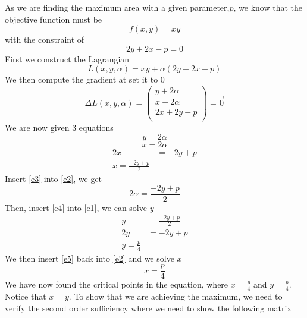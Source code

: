 
As we are finding the maximum area with a given parameter,$p$, we know that the objective function must be
\begin{equation*}
f(x,y) = xy
\end{equation*}
with the constraint of 
\begin{equation*}
2y + 2x - p = 0
\end{equation*}
First we construct the Lagrangian
\begin{equation*}
L(x,y,\alpha) = xy + \alpha(2y + 2x - p)
\end{equation*}
We then compute the gradient at set it to 0
\begin{equation*}
\Delta L(x,y,\alpha) = 
\begin{pmatrix}
y + 2\alpha\\
x + 2\alpha\\
2x + 2y -p \\
\end{pmatrix}
= \vec{0}
\end{equation*}
We are now given 3 equations
\begin{equation}\label{e1}
y = 2\alpha
\end{equation}
\begin{equation}\label{e2}
x = 2\alpha
\end{equation}
\begin{equation}
\begin{aligned}\label{e3}
2x &= -2y + p \\
x = \frac{-2y + p}{2}
\end{aligned}
\end{equation}
Insert \ref{e3} into \ref{e2}, we get
\begin{equation}\label{e4}
2 \alpha = \frac{-2y + p}{2}
\end{equation}
Then, insert \ref{e4} into \ref{e1}, we can solve $y$
\begin{equation}\label{e5}
\begin{aligned}
y &= \frac{-2y + p}{2}\\
2y &= -2y + p\\
y = \frac{p}{4}
\end{aligned}
\end{equation}
We then insert \ref{e5} back into \ref{e2} and we solve $x$
\begin{equation}
x = \frac{p}{4}
\end{equation}
We have now found the critical points in the equation, where $x = \frac{p}{4}$ and $y=\frac{p}{4}$. Notice that $x = y$. To show that we are achieving the maximum, we need to verify the second order sufficiency where we need to show the following matrix
